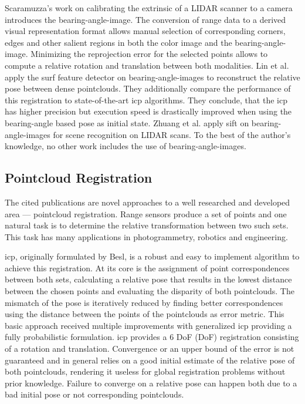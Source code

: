 Scaramuzza's work on calibrating the extrinsic of a \acrshort{LIDAR} scanner to a camera\cite{scaramuzza_iros2007} introduces the \gls{bearing-angle-image}.
The conversion of range data to a derived visual representation format allows manual selection of corresponding corners, edges and other salient regions in both the color image and the \gls{bearing-angle-image}\cite{scaramuzza_iros2007}.
Minimizing the reprojection error for the selected points allows to compute a relative rotation and translation between both modalities.
Lin et al.\cite{lin_easp2017} apply the \acrshort{surf}\cite{bay_eccv06} \gls{feature} detector on \glspl{bearing-angle-image} to reconstruct the relative pose between dense pointclouds.
They additionally compare the performance of this registration to state-of-the-art \acrshort{icp} algorithms.
They conclude, that the \acrshort{icp} has higher precision but execution speed is drastically improved when using the \gls{bearing-angle} based pose as initial state.
Zhuang et al.\cite{zhuang_iam2013} apply \acrshort{sift}\cite{lowe_ijcv04} on \glspl{bearing-angle-image} for scene recognition on \acrshort{LIDAR} scans.
To the best of the author's knowledge, no other work includes the use of \glspl{bearing-angle-image}.

\subsection{Pointcloud Registration}

The cited publications are novel approaches to a well researched and developed area --- pointcloud registration.
Range sensors produce a set of points and one natural task is to determine the relative transformation between two such sets.
This task has many applications in photogrammetry, robotics and engineering.

\acrshort{icp}, originally formulated by Besl\cite{besl_pami1992}, is a robust and easy to implement algorithm to achieve this registration.
At its core is the assignment of point correspondences between both sets, calculating a relative pose that results in the lowest distance between the chosen points and evaluating the disparity of both pointclouds.
The mismatch of the pose is iteratively reduced by finding better correspondences using the distance between the points of the pointclouds as error metric.
This basic approach received multiple improvements with generalized \acrshort{icp}\cite{segal_2009,korn_2014} providing a fully probabilistic formulation.
\acrshort{icp} provides a 6 \acrlong{DoF} (\acrshort{DoF}) registration consisting of a rotation and translation.
Convergence or an upper bound of the error is not guaranteed and in general relies on a good initial estimate of the relative pose of both pointclouds, rendering it useless for global registration problems without prior knowledge.
Failure to converge on a relative pose can happen both due to a bad initial pose or not corresponding pointclouds.

